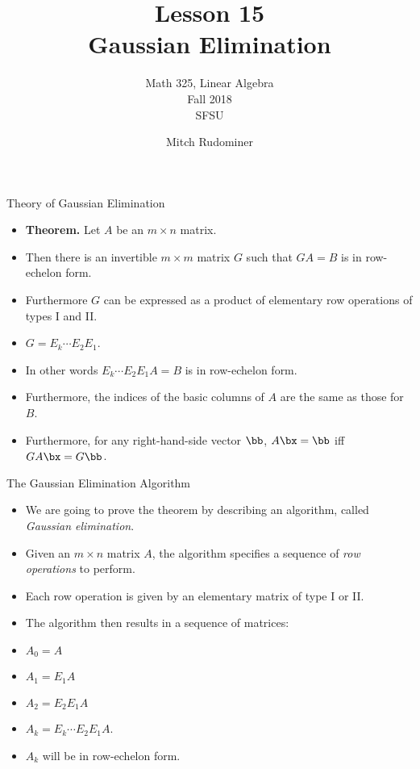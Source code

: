 \documentclass{beamer}
\title{Lesson 15 \\ Gaussian Elimination}
\subtitle{Math 325, Linear Algebra \\ Fall 2018 \\ SFSU}
\author{Mitch Rudominer}
\date{}
\begin{document}
\begin{frame}
  \titlepage
\end{frame}


\begin{frame}{Theory of Gaussian Elimination}

\begin{itemize}
\item \textbf{Theorem.} Let $A$ be an $m\times n$ matrix.
\item Then there is an invertible $m\times m$ matrix $G$ such that
$GA = B$ is in row-echelon form.
\item Furthermore $G$ can be expressed as a product of elementary row operations
of types I and II.
\item $G = E_k \cdots E_2 E_1$.
\item In other words $E_k \cdots E_2 E_1 A = B$ is in row-echelon form.
\item Furthermore, the indices of the basic columns of $A$ are the same as those for $B$.
\item Furthermore, for any right-hand-side vector $\bb$, $A\bx=\bb$ iff
$GA\bx=G\bb$.
\end{itemize}
\end{frame}


\begin{frame}{The Gaussian Elimination Algorithm}

\begin{itemize}
\item We are going to prove the theorem by describing an algorithm,
called \emph{Gaussian elimination}.
\item Given an $m\times n$ matrix $A$, the algorithm specifies a
sequence of \emph{row operations} to perform.
\item Each row operation is given by an elementary matrix of type I or II.
\item The algorithm then results in a sequence of matrices:
\item $A_0 = A$
\item $A_1 = E_1 A$
\item $A_2 = E_2 E_1 A$
\item $A_k = E_k \cdots E_2 E_1 A$.
\item $A_k$ will be in row-echelon form.
\end{itemize}
\end{frame}
\end{document}

